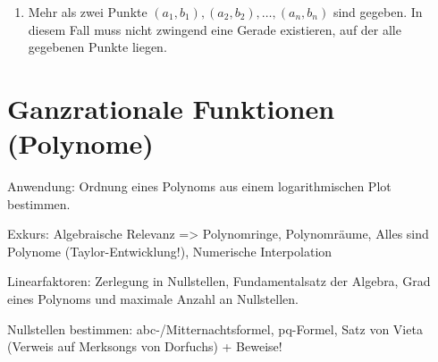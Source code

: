 \begin{problem}
\begin{enumerate}
        \item Mehr als zwei Punkte \((a_1, b_1), (a_2, b_2), \dots, (a_n, b_n)\) sind gegeben. In diesem Fall muss nicht zwingend eine Gerade existieren, auf der alle gegebenen Punkte liegen. \par
        \begin{normalfont}
            
        \end{normalfont}
    \end{enumerate}
\end{problem}

\section{Ganzrationale Funktionen (Polynome)}

Anwendung: Ordnung eines Polynoms aus einem logarithmischen Plot bestimmen. 

Exkurs: Algebraische Relevanz => Polynomringe, Polynomräume, Alles sind Polynome (Taylor-Entwicklung!), Numerische Interpolation

\begin{definition}
    
\end{definition}

\begin{definition}
    
\end{definition}

Linearfaktoren: Zerlegung in Nullstellen, Fundamentalsatz der Algebra, Grad eines Polynoms und maximale Anzahl an Nullstellen.

\begin{theorem}[Linearfaktorzerlegung]
    
\end{theorem}

\begin{theorem}
    
\end{theorem}

\begin{theorem}
    
\end{theorem}

Nullstellen bestimmen: abc-/Mitternachtsformel, pq-Formel, Satz von Vieta (Verweis auf Merksongs von Dorfuchs) + Beweise!

